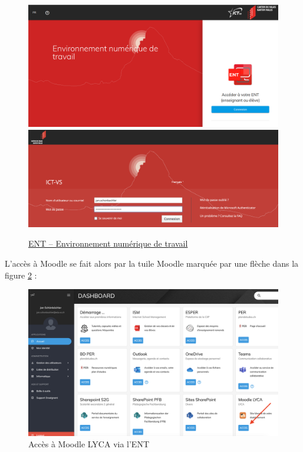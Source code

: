 \documentclass[10pt,a4paper]{report}
\begin{document}
\begin{figure} [H]
	\centering
	\includegraphics[width=0.8\linewidth]{images/capture_ENT_20210811}\\ [2ex]
	\includegraphics[width=0.8\linewidth]{images/capture_ENT_login_20210828}
	\caption{\protect \href{https://edu.vs.ch}{ENT -- Environnement numérique de travail}}
	\label{fig:accesENT}
\end{figure}


L'accès à Moodle se fait alors par la tuile Moodle marquée par une flèche dans la figure \ref{fig:accesENTversMoodle} :

\begin{figure} [H]
	\centering
	\includegraphics[width=0.8\linewidth]{images/capture_ENT_20210828}
	\caption{Accès à Moodle LYCA via l'ENT}
	\label{fig:accesENTversMoodle}
\end{figure}
\end{document}
